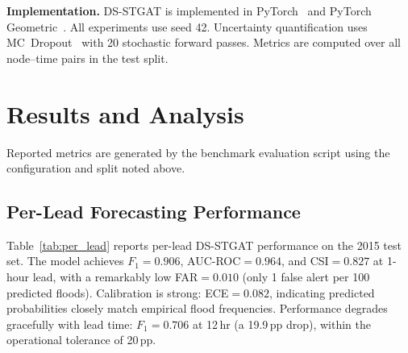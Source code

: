 \documentclass[10pt,twocolumn]{article}
\begin{document}
\smallskip\noindent\textbf{Implementation.}
DS-STGAT is implemented in PyTorch~\cite{paszke2019} and PyTorch
Geometric~\cite{fey2019}.
All experiments use seed 42.
Uncertainty quantification uses MC~Dropout~\cite{gal2016} with 20
stochastic forward passes.
Metrics are computed over all node--time pairs in the test split.

\section{Results and Analysis}
\label{sec:results}

Reported metrics are generated by the benchmark evaluation script using the
configuration and split noted above.

\subsection{Per-Lead Forecasting Performance}

Table~\ref{tab:per_lead} reports per-lead DS-STGAT performance on the
2015 test set.
The model achieves $F_1{=}0.906$, AUC-ROC${=}0.964$, and CSI${=}0.827$
at 1-hour lead, with a remarkably low FAR${=}0.010$ (only 1 false alert
per 100 predicted floods).
Calibration is strong: ECE${=}0.082$, indicating predicted probabilities
closely match empirical flood frequencies.
Performance degrades gracefully with lead time: $F_1{=}0.706$ at 12\,hr
(a 19.9\,pp drop), within the operational tolerance of 20\,pp.

\begin{table}[t]
\scriptsize
\caption{DS-STGAT per-lead performance on the 2015 Chennai flood test set
         (chronological test split; final event window).}
\label{tab:per_lead}
\centering
\setlength{\tabcolsep}{3pt}
\renewcommand{\arraystretch}{1.05}
\end{table}
\end{document}
